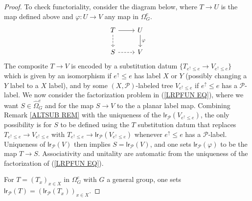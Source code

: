 \documentclass[a4paper,10pt]{article}%
\begin{document}
\begin{proof}
To check functoriality,
consider the diagram below, where $T \to U$ is the map defined above and $\varphi \colon U \to V$ any map in $\Omega_G^e$.
\begin{equation}\label{LRPFUN EQ}
\begin{tikzcd}
	T \ar{r} \ar[dashed]{d} &  U \ar{d}{\varphi}
\\
	S \ar[dashed]{r} & V
\end{tikzcd}
\end{equation}
The composite $T \to V$ is encoded by a substitution datum
$\{T_{e^{\uparrow} \leq e} \to V_{e^{\uparrow} \leq e}\}$
which is given by an isomorphism
if $e^{\uparrow} \leq e$ has label $X$ or $Y$ (possibly changing a $Y$ label to a $X$ label),
and by some $(X,\mathcal{P})$-labeled tree 
$V_{e^{\uparrow} \leq e}$ if $e^{\uparrow} \leq e$
has a $\mathcal{P}$-label.
We now consider the factorization problem 
in (\ref{LRPFUN EQ}), where we want $S \in \widehat{\Omega}_G^e$
and for the map $S \to V$ to the a planar label map.
Combining Remark \ref{ALTSUB REM} with the uniqueness of the
$\mathsf{lr}_{\mathcal{P}}(V_{e^{\uparrow} \leq e})$,
the only possibility is for $S$ to be defined using the 
$T$ substitution datum
that replaces 
$T_{e^{\uparrow} \leq e} \to V_{e^{\uparrow} \leq e}$
with 
$T_{e^{\uparrow} \leq e} \to 
\mathsf{lr}_{\mathcal{P}}(V_{e^{\uparrow} \leq e})$
whenever $e^{\uparrow} \leq e$ has a $\mathcal{P}$-label.
Uniqueness of $\mathsf{lr}_{\mathcal{P}} (V)$ then implies 
$S=\mathsf{lr}_{\mathcal{P}} (V)$, and one sets 
$\mathsf{lr}_{\mathcal{P}} (\varphi)$
to be the map $T\to S$.
Associativity and unitality are automatic from the uniqueness of the factorization of (\ref{LRPFUN EQ}).

For $T = (T_x)_{x \in X}$ in 
$\Omega_G^e$ with $G$ a general group,
one sets
$\mathsf{lr}_{\mathcal{P}}(T) = (\mathsf{lr}_{\mathcal{P}}(T_x))_{x \in X}$.
\end{proof}
\end{document}
